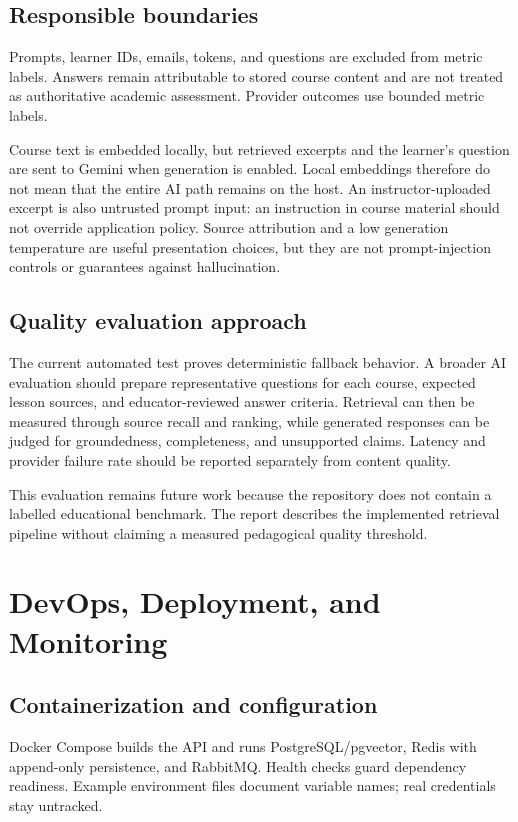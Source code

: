 \documentclass[12pt,a4paper,oneside]{report}
\begin{document}
\section{Responsible boundaries}
Prompts, learner IDs, emails, tokens, and questions are excluded from metric labels.
Answers remain attributable to stored course content and are not treated as
authoritative academic assessment. Provider outcomes use bounded metric labels.

Course text is embedded locally, but retrieved excerpts and the learner's question
are sent to Gemini when generation is enabled. Local embeddings therefore do not mean
that the entire AI path remains on the host. An instructor-uploaded excerpt is also
untrusted prompt input: an instruction in course material should not override application
policy. Source attribution and a low generation temperature are useful presentation
choices, but they are not prompt-injection controls or guarantees against hallucination.

\section{Quality evaluation approach}
The current automated test proves deterministic fallback behavior. A broader AI
evaluation should prepare representative questions for each course, expected lesson
sources, and educator-reviewed answer criteria. Retrieval can then be measured through
source recall and ranking, while generated responses can be judged for groundedness,
completeness, and unsupported claims. Latency and provider failure rate should be
reported separately from content quality.

This evaluation remains future work because the repository does not contain a labelled
educational benchmark. The report describes the implemented retrieval pipeline without
claiming a measured pedagogical quality threshold.

\chapter{DevOps, Deployment, and Monitoring}
\section{Containerization and configuration}
Docker Compose builds the API and runs PostgreSQL/pgvector, Redis with append-only
persistence, and RabbitMQ. Health checks guard dependency readiness. Example
environment files document variable names; real credentials stay untracked.
\end{document}

